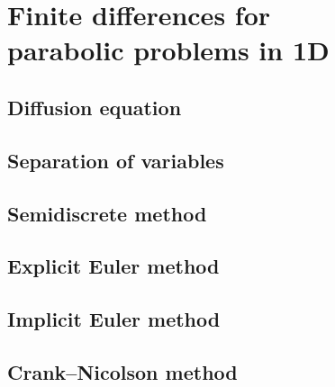 \chapter[Finite differences for parabolic problems]{Finite differences for \\
parabolic problems in 1D}

\section{Diffusion equation}

\section{Separation of variables}

\section{Semidiscrete method}

\section{Explicit Euler method}

\section{Implicit Euler method}

\section{Crank--Nicolson method}

